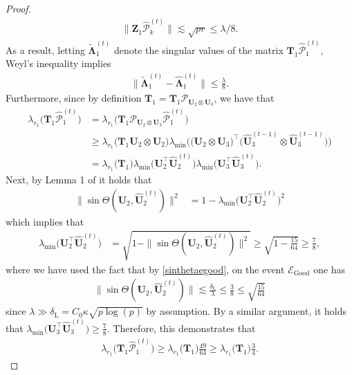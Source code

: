 \documentclass[10pt]{article}
\newcommand{\0}{{\mathbf{0}}}
\newcommand{\1}{{\mathbf{1}}}
\newcommand{\U}{{\mathbf{U}}}
\renewcommand{\citet}{\cite}
\renewcommand{\t}{^{\top}}
\newcommand{\uhat}{\mathbf{\hat{U}}}
\newcommand{\dl}{\delta_{\mathrm{L}}}
\renewcommand{\tilde}{\widetilde}
\renewcommand{\hat}{\widehat}
\renewcommand{\hat}{\widehat}
\begin{document}
{\begin{proof}
    \begin{align*}
        \| \mathbf{Z}_1 \mathcal{\hat P}_k^{(t)} \| \lesssim \sqrt{pr} \leq \lambda/8.
    \end{align*}
    As a result, letting $\mathbf{\tilde \Lambda}_1^{(t)}$ denote the singular values of the matrix $\mathbf{T}_1 \mathcal{\hat P}_1^{(t)}$, Weyl's inequality implies
    \begin{align*}
        \| \mathbf{\tilde \Lambda}_1^{(t)} - \mathbf{\hat \Lambda}_1^{(t)} \| \leq \frac{\lambda}{8}.
    \end{align*}
Furthermore, since by definition $\mathbf{T}_1 = \mathbf{T}_1 \mathcal{P}_{\mathbf{U}_{2} \otimes \U_{3}}$, we have that
\begin{align*}
  \lambda_{r_1} \bigg( \mathbf{T}_1 \mathcal{\hat {P}}_1^{(t)} \bigg)  &=  \lambda_{r_1} \bigg(  \mathbf{T}_1\mathcal{P}_{\mathbf{U}_{2} \otimes \U_{3}} \mathcal{\hat P}_1^{(t)} \bigg) \\
  &\geq \lambda_{r_1}\bigg(  \mathbf{T}_1 \U_{2} \otimes \U_{2} \bigg) \lambda_{\min} \bigg( \big( \U_{2} \otimes \U_{3} \big)\t  \big( \uhat_{3}^{(t-1)} \otimes \uhat_{3}^{(t-1)} \big)  \bigg) \\
  &= \lambda_{r_1} \bigg( \mathbf{T}_1 \bigg) \lambda_{\min} \big( \U_2\t \uhat_2^{(t)} \big) \lambda_{\min} \big( \U_3\t \uhat_3^{(t)} \big).
\end{align*}
Next, by Lemma 1 of \citet{cai_rate-optimal_2018} it holds that
\begin{align*}
    \| \sin\Theta(\U_2, \uhat_2^{(t)})\|^2 &= 1 - \lambda_{\min}\big( \U_2\t \uhat_2^{(t)} \big)^2
\end{align*}
which implies that
\begin{align*}
    \lambda_{\min}\big( \U_2\t \uhat_2^{(t)} \big) &= \sqrt{1 - \|\sin\Theta(\U_2,\uhat_2^{(t)})\|^2} \geq \sqrt{1 - \frac{15}{64}} \geq \frac{7}{8},
\end{align*}
where we have used the fact that by \eqref{sinthetaegood}, on the event $\mathcal{E}_{\mathrm{Good}}$ one has
\begin{align*}
    \|\sin\Theta(\U_2,\uhat_2^{(t)})\| \lesssim \frac{\dl}{\lambda} \leq \frac{3}{8} \leq \sqrt{\frac{15}{64}}
\end{align*}
since $\lambda \gg \dl = C_0 \kappa \sqrt{p\log(p)}$ by assumption.  By a similar argument, it holds that $\lambda_{\min}\big(\U_3\t \uhat_3^{(t)} \big) \geq \frac{7}{8}$.  
Therefore, this demonstrates that
\begin{align*}
    \lambda_{r_1} \bigg( \mathbf{T}_1 \mathcal{\hat P}_1^{(t)} \bigg) \geq \lambda_{r_1} \bigg( \mathbf{T}_1 \bigg) \frac{49}{64} \geq \lambda_{r_1} \bigg( \mathbf{T}_1 \bigg) \frac{3}{4}.

\end{align*}
\end{proof}}
\end{document}
